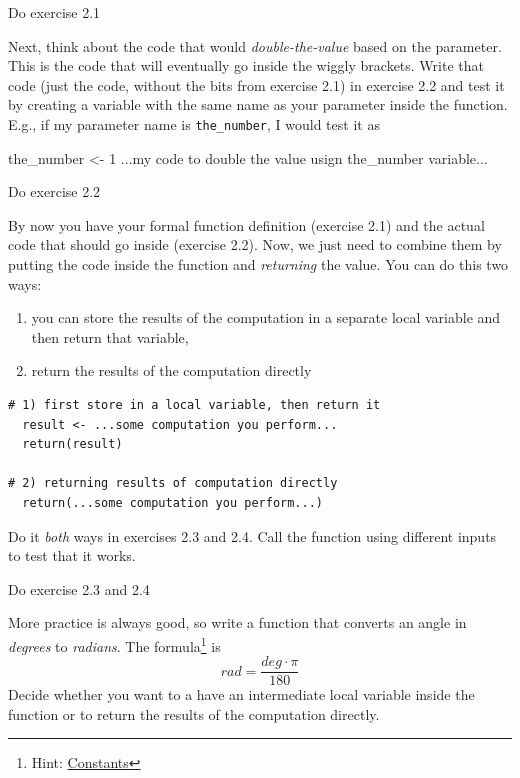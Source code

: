 \documentclass[
]{book}
\newenvironment{Shaded}{\begin{snugshade}}{\end{snugshade}}
\newcommand{\DecValTok}[1]{\textcolor[rgb]{0.00,0.00,0.81}{#1}}
\newcommand{\NormalTok}[1]{#1}
\newcommand{\OtherTok}[1]{\textcolor[rgb]{0.56,0.35,0.01}{#1}}
\providecommand{\tightlist}{%
  \setlength{\itemsep}{0pt}\setlength{\parskip}{0pt}}
\begin{document}
Do exercise 2.1

Next, think about the code that would \emph{double-the-value} based on the parameter. This is the code that will eventually go inside the wiggly brackets. Write that code (just the code, without the bits from exercise 2.1) in exercise 2.2 and test it by creating a variable with the same name as your parameter inside the function. E.g., if my parameter name is \texttt{the\_number}, I would test it as

\begin{Shaded}
\begin{Highlighting}[]
\NormalTok{the\_number }\OtherTok{\textless{}{-}} \DecValTok{1}
\NormalTok{...my code to double the value usign the\_number variable...}
\end{Highlighting}
\end{Shaded}

Do exercise 2.2

By now you have your formal function definition (exercise 2.1) and the actual code that should go inside (exercise 2.2). Now, we just need to combine them by putting the code inside the function and \emph{returning} the value. You can do this two ways:

\begin{enumerate}
\def\labelenumi{\arabic{enumi})}
\tightlist
\item
  you can store the results of the computation in a separate local variable and then return that variable,
\item
  return the results of the computation directly
\end{enumerate}

\begin{verbatim}
# 1) first store in a local variable, then return it
  result <- ...some computation you perform...
  return(result)

# 2) returning results of computation directly
  return(...some computation you perform...)
\end{verbatim}

Do it \emph{both} ways in exercises 2.3 and 2.4. Call the function using different inputs to test that it works.

Do exercise 2.3 and 2.4

More practice is always good, so write a function that converts an angle in \emph{degrees} to \emph{radians}. The formula\footnote{Hint: \href{https://stat.ethz.ch/R-manual/R-devel/library/base/html/Constants.html}{Constants}} is
\[rad = \frac{deg \cdot \pi}{180}\]
Decide whether you want to a have an intermediate local variable inside the function or to return the results of the computation directly.
\end{document}
